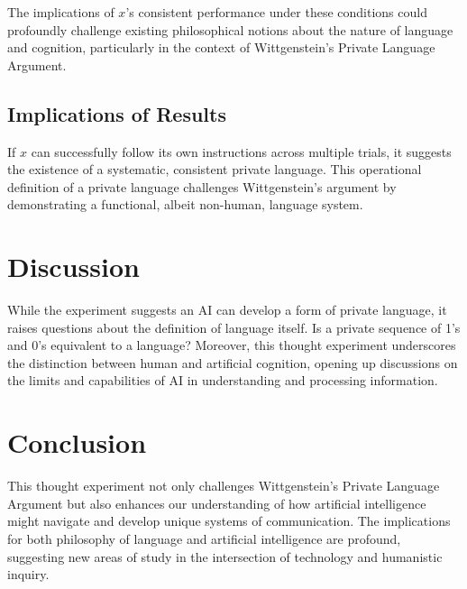 \documentclass[12pt]{article}
\begin{document}
The implications of \( x \)'s consistent performance under these conditions could profoundly challenge existing philosophical notions about the nature of language and cognition, particularly in the context of Wittgenstein's Private Language Argument.


\subsection{Implications of Results}
If \( x \) can successfully follow its own instructions across multiple trials, it suggests the existence of a systematic, consistent private language. This operational definition of a private language challenges Wittgenstein's argument by demonstrating a functional, albeit non-human, language system.

\section{Discussion}
While the experiment suggests an AI can develop a form of private language, it raises questions about the definition of language itself. Is a private sequence of 1's and 0's equivalent to a language? Moreover, this thought experiment underscores the distinction between human and artificial cognition, opening up discussions on the limits and capabilities of AI in understanding and processing information.

\section{Conclusion}
This thought experiment not only challenges Wittgenstein's Private Language Argument but also enhances our understanding of how artificial intelligence might navigate and develop unique systems of communication. The implications for both philosophy of language and artificial intelligence are profound, suggesting new areas of study in the intersection of technology and humanistic inquiry.
\end{document}
